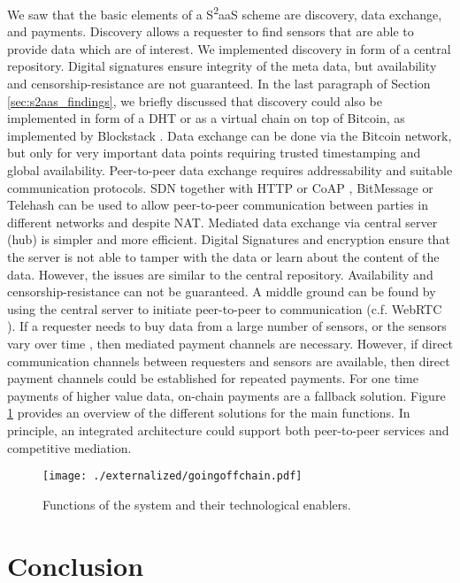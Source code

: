 We saw that the basic elements of a S\textsuperscript{2}aaS scheme are discovery, data exchange, and payments. Discovery allows a requester to find sensors that are able to provide data which are of interest. We implemented discovery in form of a central repository. Digital signatures ensure integrity of the meta data, but availability and censorship-resistance are not guaranteed. In the last paragraph of Section \ref{sec:s2aas_findings}, we briefly discussed that discovery could also be implemented in form of a \ac{DHT} or as a virtual chain on top of Bitcoin, as implemented by Blockstack \parencite{ali2016blockstack}. Data exchange can be done via the Bitcoin network, but only for very important data points requiring trusted timestamping and global availability. Peer-to-peer data exchange requires addressability and suitable communication protocols. \ac{SDN} together with \ac{HTTP} or \ac{CoAP} \parencite{shelby2014constrained}, BitMessage \parencite{warren2012bitmessage} or Telehash can be used to allow peer-to-peer communication between parties in different networks and despite \ac{NAT}. Mediated data exchange via central server (hub) is simpler and more efficient. Digital Signatures and encryption ensure that the server is not able to tamper with the data or learn about the content of the data. However, the issues are similar to the central repository. Availability and censorship-resistance can not be guaranteed. A middle ground can be found by using the central server to initiate peer-to-peer to communication (c.f. WebRTC \parencite{bergkvist2012narayanan}). If a requester needs to buy data from a large number of sensors, or the sensors vary over time , then mediated payment channels are necessary. However, if direct communication channels between requesters and sensors are available, then direct payment channels could be established for repeated payments. For one time payments of higher value data, on-chain payments are a fallback solution. Figure \ref{fig:conceptual_overview} provides an overview of the different solutions for the main functions. In principle, an integrated architecture could support both peer-to-peer services and competitive mediation. 

\begin{figure}
 \centering
 \texttt{[image: ./externalized/goingoffchain.pdf]}
 \caption{Functions of the system and their technological enablers.}
 \label{fig:conceptual_overview}
 \end{figure}


\section{Conclusion}
\label{sec:trust-lessconclusion}

